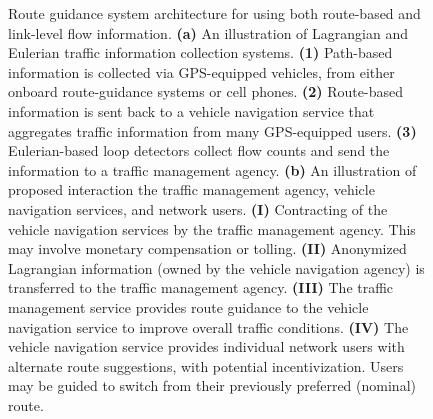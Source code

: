 \begin{figure}
\begin{centering}
\enskip{}
\par\end{centering}

\protect\caption{Route guidance system architecture for using both route-based and
link-level flow information. \textbf{(a)} An illustration of Lagrangian
and Eulerian traffic information collection systems. \textbf{(1)}
Path-based information is collected via GPS-equipped vehicles, from
either onboard route-guidance systems or cell phones. \textbf{(2)}
Route-based information is sent back to a vehicle navigation service
that aggregates traffic information from many GPS-equipped users.
\textbf{(3)} Eulerian-based loop detectors collect flow counts and
send the information to a traffic management agency. \textbf{(b)}
An illustration of proposed interaction the traffic management agency,
vehicle navigation services, and network users. \textbf{(I)} Contracting
of the vehicle navigation services by the traffic management agency.
This may involve monetary compensation or tolling. \textbf{(II)} Anonymized
Lagrangian information (owned by the vehicle navigation agency) is
transferred to the traffic management agency. \textbf{(III)} The traffic
management service provides route guidance to the vehicle navigation
service to improve overall traffic conditions. \textbf{(IV)} The vehicle
navigation service provides individual network users with alternate
route suggestions, with potential incentivization. Users may be guided
to switch from their previously preferred (nominal) route.\label{fig:Lagrangian-Eulerian-route-guidan}}
\end{figure}


